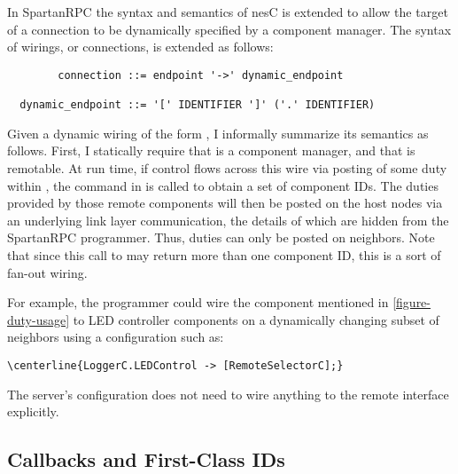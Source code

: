 In SpartanRPC the syntax and semantics of nesC is extended to allow the target of a connection
to be dynamically specified by a component manager. The syntax of wirings, or connections, is
extended as follows:

\begin{lrbox}{\savebigbox}
\begin{minipage}{4.3in}
\vspace{0.6em}
\begin{Verbatim}
        connection ::= endpoint '->' dynamic_endpoint

  dynamic_endpoint ::= '[' IDENTIFIER ']' ('.' IDENTIFIER)
\end{Verbatim}
\vspace{0.3em}
\end{minipage}
\end{lrbox}
\centerline{\usebox{\savebigbox}}

Given a dynamic wiring of the form , I informally summarize its semantics as
follows. First, I statically require that  is a component manager, and that  is
remotable. At run time, if control flows across this wire via posting of some duty 
within , the command  in  is called to obtain a set of component
IDs. The duties  provided by those remote components will then be posted on the host
nodes via an underlying link layer communication, the details of which are hidden from the
SpartanRPC programmer. Thus, duties can only be posted on neighbors. Note that since this call
to  may return more than one component ID, this is a sort of fan-out wiring.

For example, the programmer could wire the  component mentioned in
\autoref{figure-duty-usage} to LED controller components on a dynamically changing subset of
neighbors using a configuration such as:
\begin{Verbatim}[commandchars=\\\{\}]
\centerline{LoggerC.LEDControl -> [RemoteSelectorC];}
\end{Verbatim}

The server's configuration does not need to wire anything to the remote interface explicitly.

\subsection{Callbacks and First-Class IDs}

